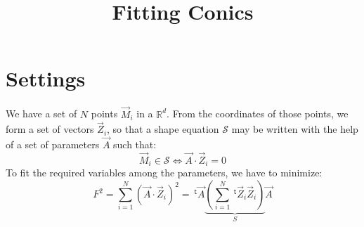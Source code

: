 \documentclass[aps]{revtex4}
\newcommand{\mytrn}[1]{~^{\mathsf{t}}\!{#1}}
\begin{document}
\title{Fitting Conics}
\maketitle
\section{Settings}

We have a set of $N$ points $\vec{M}_i$ in a $\mathbb{R}^d$.
From the coordinates of those points, we form a set of vectors $\vec{Z}_i$,
so that a shape equation $\mathcal{S}$ may be written with the help of a set of parameters $\vec{A}$
such that:
\begin{equation}
\vec{M}_i\in\mathcal{S} \Leftrightarrow \vec{A}\cdot\vec{Z}_i = 0
\end{equation}
To fit the required variables among the parameters, we have to minimize:
\begin{equation}
 F^2 = \sum_{i=1}^N \left(\vec{A}\cdot\vec{Z}_i\right)^2
  = \mytrn{\vec{A}} \underbrace{\left(\sum_{i=1}^N\mytrn{\vec{Z}_i}\vec{Z}_i\right)}_{S} \vec{A}
\end{equation}
\end{document}
